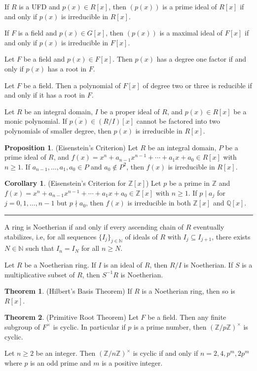 \documentclass[12pt]{article}
\newcommand{\sepline}{\rule{\textwidth}{0.4pt}}
\theoremstyle{definition}
\newtheorem{theorem}{Theorem}
\newtheorem{corollary}{Corollary}
\newtheorem{proposition}{Proposition}
\newcommand{\N}{\mathbb{N}}
\newcommand{\Z}{\mathbb{Z}}
\newcommand{\Q}{\mathbb{Q}}
\newcommand{\<}{\left\langle}
\renewcommand{\>}{\right\rangle}
\newcommand{\eqc}{\overline}
\newcommand{\divides}{\mid}
\newcommand{\ndivides}{\nmid}
\begin{document}
If $R$ is a UFD and $p(x) \in R[x]$, then $(p(x))$ is a prime ideal of $R[x]$ if and only if $p(x)$ is irreducible in $R[x]$.

If $F$ is a field and $p(x) \in G[x]$, then $(p(x))$ is a maximal ideal of $F[x]$ if and only if $p(x)$ is irreducible in $F[x]$.

Let $F$ be a field and $p(x) \in F[x]$. Then $p(x)$ has a degree one factor if and only if $p(x)$ has a root in $F$.

Let $F$ be a field. Then a polynomial of $F[x]$ of degree two or three is reducible if and only if it has a root in $F$.

Let $R$ be an integral domain, $I$ be a proper ideal of $R$, and $p(x) \in R[x]$ be a monic polynomial. If $\eqc{p(x)} \in (R/I)[x]$ cannot be factored into two polynomials of smaller degree, then $p(x)$ is irreducible in $R[x]$.

\begin{proposition}(Eisenstein's Criterion)
    Let $R$ be an integral domain, $P$ be a prime ideal of $R$, and $f(x) = x^n + a_{n-1}x^{n-1} + \cdots + a_1 x + a_0 \in R[x]$ with $n \geq 1$. If $a_{n-1}, \dots, a_1, a_0 \in P$ and $a_0 \notin P^2$, then $f(x)$ is irreducible in $R[x]$.
\end{proposition}

\begin{corollary}(Eisenstein's Criterion for $\Z[x]$)
    Let $p$ be a prime in $\Z$ and $f(x) = x^n + a_{n-1}x^{n-1} + \cdots + a_1 x + a_0 \in \Z[x]$ with $n \geq 1$. If $p \divides a_j$ for $j = 0, 1, \dots, n-1$ but $p \ndivides a_0$, then $f(x)$ is irreducible in both $\Z[x]$ and $\Q[x]$.
\end{corollary}

\sepline

A ring is Noetherian if and only if every ascending chain of $R$ eventually stabilizes, i.e, for all sequences $\{I_j\}_{j\in\N}$ of ideals of $R$ with $I_j \subseteq I_{j+1}$, there exists $N \in \N$ such that $I_n = I_N$ for all $n \geq N$.

Let $R$ be a Noetherian ring. If $I$ is an ideal of $R$, then $R/I$ is Noetherian. If $S$ is a multiplicative subset of $R$, then $S^{-1}R$ is Noetherian.

\begin{theorem}(Hilbert's Basis Theorem)
    If $R$ is a Noetherian ring, then so is $R[x]$.
\end{theorem}

\begin{theorem}(Primitive Root Theorem)
    Let $F$ be a field. Then any finite subgroup of $F^\times$ is cyclic. In particular if $p$ is a prime number, then $(\Z/p\Z)^\times$ is cyclic.
\end{theorem}

Let $n \geq 2$ be an integer. Then $(\Z/n\Z)^\times$ is cyclic if and only if $n = 2, 4, p^m, 2p^m$ where $p$ is an odd prime and $m$ is a positive integer.
\end{document}
